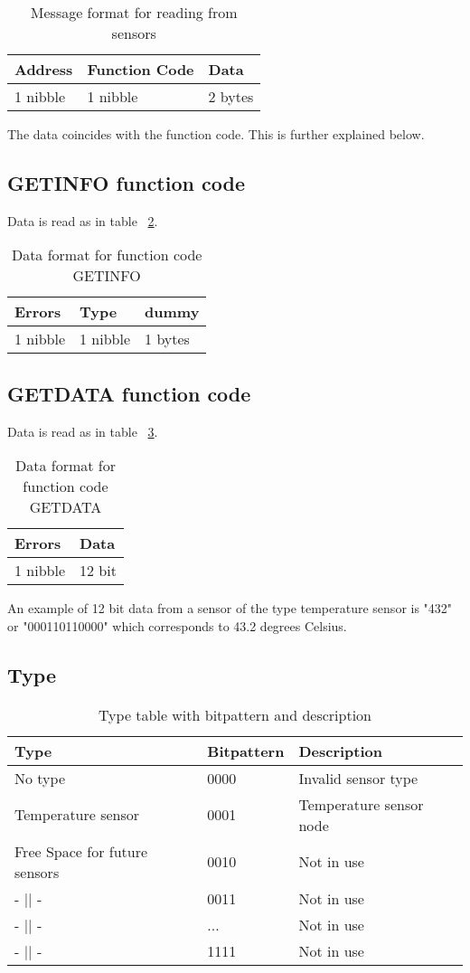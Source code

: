 \begin{table}[H]
\centering
\begin{tabular}{|l|l|l|}
	\hline
	Address & Function Code & Data \\ \hline
	1 nibble & 1 nibble	& 2 bytes \\
	\hline
\end{tabular}
\caption{Message format for reading from sensors }
\label{table:stdmsgfromsensor}
\end{table}
The data coincides with the function code. This is further explained below.

\subsection{GETINFO function code}
Data is read as in table ~\ref{table:Datagetinfo}.
\begin{table}[H]
\centering
\begin{tabular}{|l|l|l|}
	\hline
	Errors & Type & dummy \\ \hline
	1 nibble & 1 nibble	& 1 bytes \\
	\hline
\end{tabular}
\caption{Data format for function code GETINFO }
\label{table:Datagetinfo}
\end{table}
\subsection{GETDATA function code}
Data is read as in table ~\ref{table:Datagetdata}.
\begin{table}[H]
\centering
\begin{tabular}{|l|l|}
	\hline
	Errors & Data \\ \hline
	1 nibble & 12 bit \\
	\hline
\end{tabular}
\caption{Data format for function code GETDATA }
\label{table:Datagetdata}
\end{table}
An example of 12 bit data from a sensor of the type temperature sensor is "432" or "000110110000" which corresponds to 43.2 degrees Celsius.

\subsection{Type}
\begin{table}[H]
\centering
\begin{tabular}{|l|l|l|}
	\hline
	Type & Bitpattern & Description \\ 
	\hline
	No type 	& 0000 & Invalid sensor type \\
	\hline
	Temperature sensor & 0001 & Temperature sensor node \\
	\hline
	Free Space for future sensors & 0010 & Not in use \\
	\hline
	- || - & 0011 & Not in use \\
	\hline
	- || - & ... & Not in use \\
	\hline
	- || - & 1111 & Not in use \\
	\hline
\end{tabular}
\caption{Type table with bitpattern and description}
\label{table:typetable}
\end{table}

